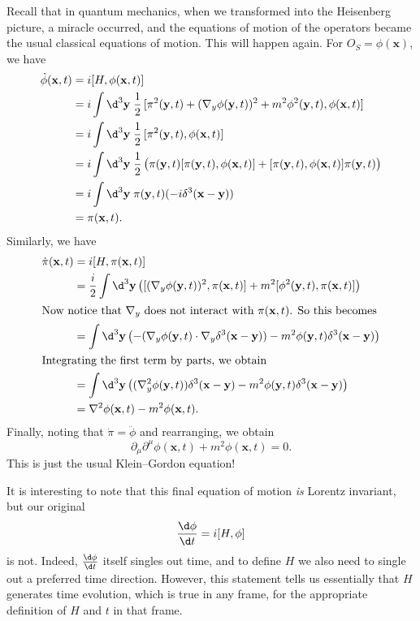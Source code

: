 \documentclass[a4paper]{article}
\begin{document}
Recall that in quantum mechanics, when we transformed into the Heisenberg picture, a miracle occurred, and the equations of motion of the operators became the usual classical equations of motion. This will happen again. For $O_S = \phi(\mathbf{x})$, we have
\begin{align*}
  \dot{\phi}(\mathbf{x}, t) &= i[H, \phi(\mathbf{x}, t)] \\
  &= i\int \d^3 \mathbf{y}\;\frac{1}{2} \, [\pi^2(\mathbf{y}, t) + (\nabla_y \phi(\mathbf{y}, t))^2 + m^2 \phi^2(\mathbf{y}, t), \phi(\mathbf{x}, t)]\\
  &= i\int \d^3 \mathbf{y}\;\frac{1}{2} \, [\pi^2(\mathbf{y}, t), \phi(\mathbf{x}, t)]\\
  &= i\int \d^3 \mathbf{y}\;\frac{1}{2} \, \bigl( \pi(\mathbf{y}, t) [\pi(\mathbf{y}, t), \phi(\mathbf{x}, t)] + [\pi(\mathbf{y}, t), \phi(\mathbf{x}, t)] \pi(\mathbf{y}, t)\bigr)\\
  &= i\int \d^3 \mathbf{y}\; \pi(\mathbf{y}, t) (-i \delta^3(\mathbf{x} - \mathbf{y}))\\
  &= \pi(\mathbf{x}, t).
\end{align*}
Similarly, we have
\begin{align*}
  \dot{\pi}(\mathbf{x}, t) &= i[H, \pi(\mathbf{x}, t)]\\
  &= \frac{i}{2}\int \d^3 \mathbf{y} \left( [(\nabla_y \phi(\mathbf{y}, t))^2, \pi(\mathbf{x}, t)] + m^2 [\phi^2(\mathbf{y}, t), \pi(\mathbf{x}, t)]\right)\\
  \intertext{Now notice that $\nabla_y$ does not interact with $\pi(\mathbf{x}, t)$. So this becomes}
  &= \int \d^3 \mathbf{y} \left( -(\nabla_y \phi(\mathbf{y}, t) \cdot \nabla_y \delta^3(\mathbf{x} - \mathbf{y})) - m^2 \phi(\mathbf{y}, t) \delta^3(\mathbf{x} - \mathbf{y})\right)\\
  \intertext{Integrating the first term by parts, we obtain}
  &= \int \d^3 \mathbf{y} \left( (\nabla^2_y \phi(\mathbf{y}, t)) \delta^3(\mathbf{x} - \mathbf{y}) - m^2 \phi(\mathbf{y}, t) \delta^3(\mathbf{x} - \mathbf{y}) \right)\\
  &= \nabla^2 \phi(\mathbf{x}, t) - m^2 \phi(\mathbf{x}, t).
\end{align*}
Finally, noting that $\dot{\pi} = \ddot{\phi}$ and rearranging, we obtain
\[
  \partial_\mu \partial^\mu \phi(\mathbf{x}, t) + m^2 \phi(\mathbf{x}, t) = 0.
\]
This is just the usual Klein--Gordon equation!

It is interesting to note that this final equation of motion \emph{is} Lorentz invariant, but our original
\[
  \frac{\d \phi}{\d t} = i[H, \phi]
\]
is not. Indeed, $\frac{\d\phi}{\d t}$ itself singles out time, and to define $H$ we also need to single out a preferred time direction. However, this statement tells us essentially that $H$ generates time evolution, which is true in any frame, for the appropriate definition of $H$ and $t$ in that frame.
\end{document}
